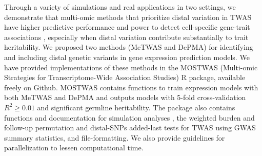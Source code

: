 Through a variety of simulations and 
real applications in two settings,
we demonstrate that multi-omic methods 
that prioritize distal variation in TWAS 
have higher predictive performance
and power to detect cell-specific gene-trait 
associations \cite{Brown2013IntegrativeEQTLs,Pierce2018Co-occurringMechanisms,vanderWijst2019Single-cellDisease},
especially when distal variation
contribute substantially to trait heritability.
We proposed two methods (MeTWAS
and DePMA) for
identifying and including distal
genetic variants in gene
expression prediction models.
We have provided implementations of these
methods in the MOSTWAS
(Multi-omic Strategies for Transcriptome-Wide
Association Studies)
R package, available freely
on Github.
MOSTWAS contains functions
to train expression models
with both MeTWAS and DePMA
and outputs models
with 5-fold cross-validation $R^2 \geq 0.01$
and significant germline heritability.
The package also contains functions and documentation
for simulation analyses
\cite{Mancuso2019ProbabilisticStudies},
the weighted burden \cite{Pasaniuc2014FastEnrichment,Gusev2016}
and follow-up permutation \cite{Gusev2016} and distal-SNPs
added-last tests for TWAS
using GWAS summary statistics,
and file-formatting. We also provide
guidelines for parallelization
to lessen computational time.

